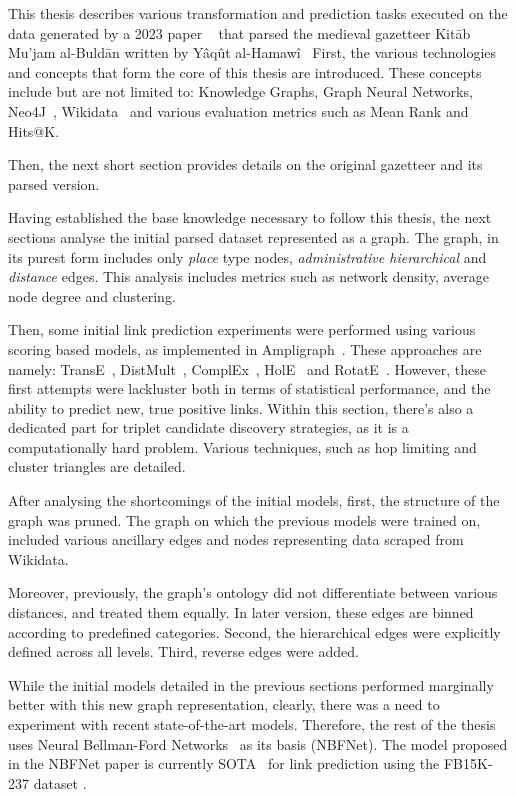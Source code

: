 This thesis describes various transformation and prediction tasks executed on the data generated by a 2023 paper ~\cite{YaqutRB} that parsed the medieval gazetteer Kitāb Mu'jam al-Buldān written by Yâqût al-Hamawî~\cite{Yaqut}
First, the various technologies and concepts that form the core of this thesis are introduced.
These concepts include but are not limited to: Knowledge Graphs, Graph Neural Networks, Neo4J~\cite{Neo4j}, Wikidata~\cite{Wikidata} and various
evaluation metrics such as Mean Rank and Hits@K.

Then, the next short section provides details on the original gazetteer and its parsed version.

Having established the base knowledge necessary to follow this thesis, the next sections analyse the initial parsed dataset represented as a graph.
The graph, in its purest form includes only \textit{place} type nodes,  \textit{administrative hierarchical} and \textit{distance} edges.
This analysis includes metrics such as network density, average node degree and clustering.

Then, some initial link prediction experiments were performed using various scoring based models, as implemented in Ampligraph~\cite{ampligraph}.
These approaches are namely: TransE~\cite{TransE}, DistMult~\cite{DistMult}, ComplEx~\cite{ComplEx}, HolE~\cite{HolE} and RotatE~\cite{RotatE}.
However, these first attempts were lackluster  both in terms of statistical performance, and the ability to predict new, true positive links.
Within this section, there's also a dedicated part for triplet candidate discovery strategies, as it is a computationally hard problem.
Various techniques, such as hop limiting and cluster triangles are detailed.

After analysing the shortcomings of the initial models, first, the structure of the graph was pruned.
The graph on which the previous models were trained on, included various ancillary edges and nodes representing data scraped from Wikidata.

Moreover, previously, the graph's ontology did not differentiate between various distances, and treated them equally.
In later version, these edges are binned according to predefined categories.
Second, the hierarchical edges were explicitly defined across all levels.
Third, reverse edges were added.

While the initial models detailed in the previous sections performed marginally better with this new graph representation,
clearly, there was a need to experiment with recent state-of-the-art models.
Therefore, the rest of the thesis uses Neural Bellman-Ford Networks~\cite{NBFNet} as its basis (NBFNet).
The model proposed in the NBFNet paper is currently SOTA~\cite{NBFNetSota} for link prediction using the FB15K-237 dataset .

